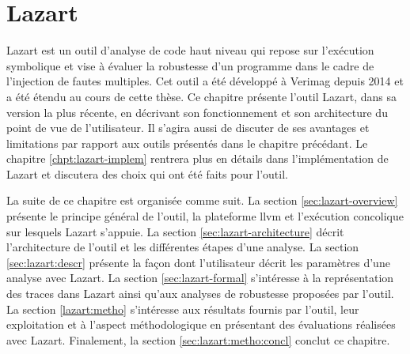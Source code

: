 \chapter{Lazart}
\label{chpt:lazart}


    Lazart \cite{Potet/ICST14} est un outil d'analyse de code haut niveau qui repose sur l'exécution symbolique et vise à évaluer la robustesse d'un programme dans le cadre de l'injection de fautes multiples. 
    Cet outil a été développé à Verimag depuis 2014 et a été étendu au cours de cette thèse. 
    Ce chapitre présente l'outil Lazart, dans sa version la plus récente, en décrivant son fonctionnement et son architecture du point de vue de l'utilisateur. 
    Il s'agira aussi de discuter de ses avantages et limitations par rapport aux outils présentés dans le chapitre précédant.
    Le chapitre \ref{chpt:lazart-implem} rentrera plus en détails dans l'implémentation de Lazart et discutera des choix qui ont été faits pour l'outil.
    
    La suite de ce chapitre est organisée comme suit.  
    La section \ref{sec:lazart-overview} présente le principe général de l'outil, la plateforme \gls{llvm} et l'exécution concolique sur lesquels Lazart s'appuie.
    La section \ref{sec:lazart-architecture} décrit l'architecture de l'outil et les différentes étapes d'une analyse.
    La section \ref{sec:lazart:descr} présente la façon dont l'utilisateur décrit les paramètres d'une analyse avec Lazart.
    La section \ref{sec:lazart-formal} s'intéresse à la représentation des traces dans Lazart ainsi qu'aux analyses de robustesse proposées par l'outil.
    La section \ref{lazart:metho} s'intéresse aux résultats fournis par l'outil, leur exploitation et à l'aspect méthodologique en présentant des évaluations réalisées avec Lazart.
    Finalement, la section \ref{sec:lazart:metho:concl} conclut ce chapitre.
    
